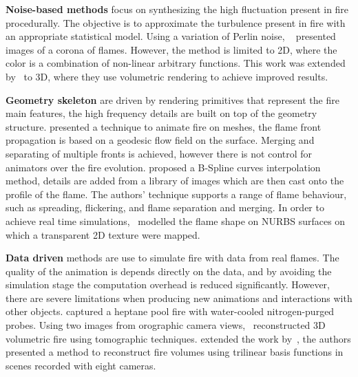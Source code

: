 \textbf{Noise-based methods} focus on synthesizing the high fluctuation present in fire procedurally.
The objective is to approximate the turbulence present in fire with an appropriate statistical model.
Using a variation of Perlin noise, ~\cite{Perlin:1985} presented images of a corona of flames.
However, the method is limited to 2D, where the color is a combination of non-linear arbitrary functions.
This work was extended by~\cite{Perlin:1989} to 3D, where they use volumetric rendering to achieve improved results.

\textbf{Geometry skeleton} are driven by rendering primitives that represent the fire main features, the high frequency details are built on top of the geometry structure.
\cite{Lee:2001} presented a technique to animate fire on meshes, the flame front propagation is based on a geodesic flow field on the surface.
Merging and separating of multiple fronts is achieved, however there is not control for animators over the fire evolution. 
\cite{Lamorlette:2002} proposed a B-Spline curves interpolation method, details are added from a library of images which are then cast onto the profile of the flame.
The authors' technique supports a range of flame behaviour, such as spreading, flickering, and flame separation and merging.
In order to achieve real time simulations,~\cite{Bridault:2006} modelled the flame shape on NURBS surfaces on which a transparent 2D texture were mapped.

\textbf{Data driven} methods are use to simulate fire with data from real flames.
The quality of the animation is depends directly on the data, and by avoiding the simulation stage the computation overhead is reduced significantly.
However, there are severe limitations when producing new animations and interactions with other objects.
\cite{Rushmeier:1995} captured a heptane pool fire with water-cooled nitrogen-purged probes.
Using two images from orographic camera views,~\cite{Hasinoff:2003} reconstructed 3D volumetric fire using tomographic techniques.
\cite{Ihrke:2004} extended the work by~\cite{Hasinoff:2003}, the authors presented a method to reconstruct fire volumes using trilinear basis functions in scenes recorded with eight cameras.

